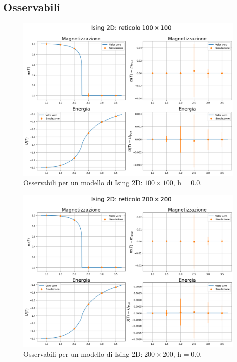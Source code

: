 \vspace*{\fill}



\subsection{Osservabili}

\vspace*{\fill}

\begin{figure}[H]
    \centering
    \includegraphics[page=1, width=\textwidth]{Immagini/simIsing2D/obs/obs_100.png}
    \caption{Osservabili per un modello di Ising 2D: $100 \times 100$, h = 0.0.}
\end{figure}

\vspace*{\fill}

\newpage

\vspace*{\fill}

\begin{figure}[H]
    \centering
    \includegraphics[page=1, width=\textwidth]{Immagini/simIsing2D/obs/obs_200.png}
    \caption{Osservabili per un modello di Ising 2D: $200 \times 200$, h = 0.0.}
\end{figure}

